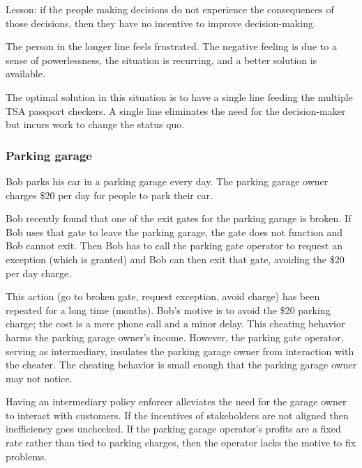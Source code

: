 Lesson: if the people making decisions do not experience the consequences of those decisions, then they have no incentive to improve decision-making.

The person in the longer line feels frustrated. The negative feeling is due to a sense of powerlessness, the situation is recurring, and a better solution is available.

The optimal solution in this situation is to have a single line feeding the multiple TSA passport checkers. A single line eliminates the need for the decision-maker but incurs work to change the status quo.


\subsubsection{Parking garage}

\begin{mdframed}
Bob parks his car in a parking garage every day. 
The parking garage owner charges \$20 per day for people to park their car.

Bob recently found that one of the exit gates for the parking garage is broken. If Bob uses that gate to leave the parking garage, the gate does not function and Bob cannot exit. Then Bob has to call the parking gate operator to request an exception (which is granted) and Bob can then exit that gate, avoiding the \$20 per day charge.

This action (go to broken gate, request exception, avoid charge) has been repeated for a long time (months). Bob's motive is to avoid the \$20 parking charge; the cost is a mere phone call and a minor delay. This cheating behavior harms the parking garage owner's income. However, the parking gate operator, serving as intermediary, insulates the parking garage owner from interaction with the cheater. The cheating behavior is small enough that the parking garage owner may not notice.
\end{mdframed}

Having an intermediary policy enforcer alleviates the need for the garage owner to interact with customers. If the incentives of stakeholders are not aligned then inefficiency goes unchecked. If the parking garage operator's profits are a fixed rate rather than tied to parking charges, then the operator lacks the motive to fix problems. 